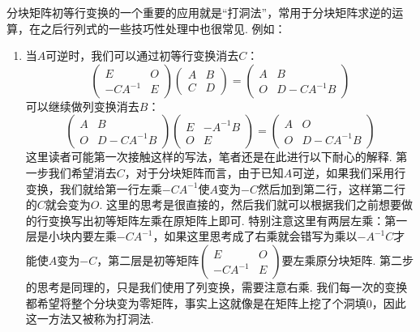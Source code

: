 分块矩阵初等行变换的一个重要的应用就是``打洞法''，常用于分块矩阵求逆的运算，在之后行列式的一些技巧性处理中也很常见. 例如：
\begin{enumerate}
    \item 当$A$可逆时，我们可以通过初等行变换消去$C$：
          \[ \begin{pmatrix}
                  E & O \\ -CA^{-1} & E
              \end{pmatrix}\begin{pmatrix}
                  A & B \\ C & D
              \end{pmatrix}=\begin{pmatrix}
                  A & B \\ O & D-CA^{-1}B
              \end{pmatrix} \]
          可以继续做列变换消去$B$：
          \[ \begin{pmatrix}
                  A & B \\ O & D-CA^{-1}B
              \end{pmatrix}\begin{pmatrix}
                  E & -A^{-1}B \\ O & E
              \end{pmatrix}=\begin{pmatrix}
                  A & O \\ O & D-CA^{-1}B
              \end{pmatrix} \]
          这里读者可能第一次接触这样的写法，笔者还是在此进行以下耐心的解释. 第一步我们希望消去$C$，对于分块矩阵而言，由于已知$A$可逆，如果我们采用行变换，我们就给第一行左乘$-CA^{-1}$使$A$变为$-C$然后加到第二行，这样第二行的$C$就会变为$O$. 这里的思考是很直接的，然后我们就可以根据我们之前想要做的行变换写出初等矩阵左乘在原矩阵上即可. 特别注意这里有两层左乘：第一层是小块内要左乘$-CA^{-1}$，如果这里思考成了右乘就会错写为乘以$-A^{-1}C$才能使$A$变为$-C$，第二层是初等矩阵$\begin{pmatrix}
                  E & O \\ -CA^{-1} & E
              \end{pmatrix}$要左乘原分块矩阵. 第二步的思考是同理的，只是我们使用了列变换，需要注意右乘. 我们每一次的变换都希望将整个分块变为零矩阵，事实上这就像是在矩阵上挖了个洞填0，因此这一方法又被称为打洞法.


\end{enumerate}
